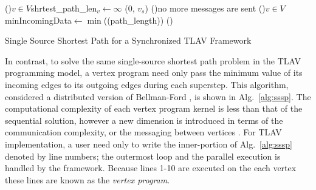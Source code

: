 \documentclass[reprint,twocolumn,showpacs,preprintnumbers,amsmath, aps,pre,amssymb]{revtex4-1}
\begin{document}
\begin{algorithm*}[t]
\small{
\SetAlgoNoLine
    \BlankLine
    \lForEach(){$v \in V$}{shrtest\_path\_len$_v\gets \infty$}
    \send(0, $v_s$)
    \Repeat(){no more messages are sent}{
        \Indp\ForPar(){$v \in V$}{
            \LinesNumbered
            \Indp{}
            minIncomingData$\gets \min$(\receive(path\_length))\;
            \halt()\;
        }
    }
 \caption{Single Source Shortest Path for a Synchronized TLAV Framework}
 \label{alg:sssp}
 }
\end{algorithm*}

In contrast, to solve the same single-source shortest path problem in the TLAV programming model, a vertex program need only pass the minimum value of its incoming edges to its outgoing edges during each superstep. This algorithm, considered a distributed version of Bellman-Ford \cite{Lynch1996}, is shown in Alg.~\ref{alg:sssp}.  The computational complexity of each vertex program kernel is less than that of the sequential solution, however a new dimension is introduced in terms of the communication complexity, or the messaging between vertices \cite{Lynch1996}.  For TLAV implementation, a user need only to write the inner-portion of Alg.~\ref{alg:sssp} denoted by line numbers; the outermost loop and the parallel execution is handled by the framework. Because lines 1-10 are executed on the each vertex these lines are known as the \emph{vertex program}.
\end{document}
